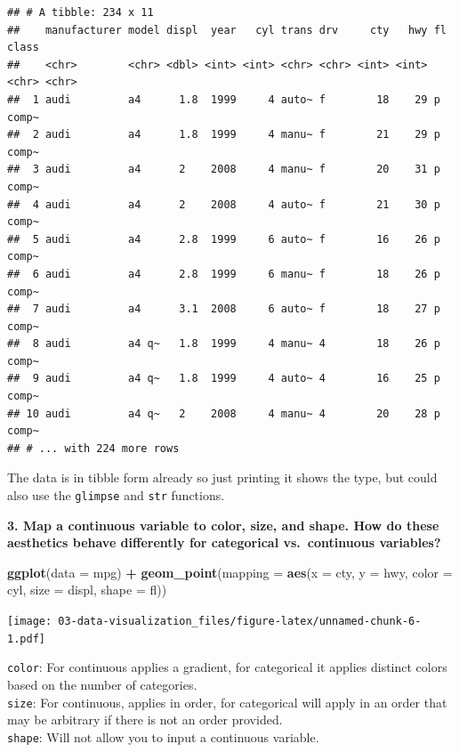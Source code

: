 \documentclass[]{book}
\newenvironment{Shaded}{\begin{snugshade}}{\end{snugshade}}
\newcommand{\DataTypeTok}[1]{\textcolor[rgb]{0.13,0.29,0.53}{#1}}
\newcommand{\KeywordTok}[1]{\textcolor[rgb]{0.13,0.29,0.53}{\textbf{#1}}}
\newcommand{\NormalTok}[1]{#1}
\newcommand{\OperatorTok}[1]{\textcolor[rgb]{0.81,0.36,0.00}{\textbf{#1}}}
\newcommand{\StringTok}[1]{\textcolor[rgb]{0.31,0.60,0.02}{#1}}
\theoremstyle{definition}
\theoremstyle{definition}
\theoremstyle{definition}
\theoremstyle{remark}
\begin{document}
\begin{verbatim}
## # A tibble: 234 x 11
##    manufacturer model displ  year   cyl trans drv     cty   hwy fl    class
##    <chr>        <chr> <dbl> <int> <int> <chr> <chr> <int> <int> <chr> <chr>
##  1 audi         a4      1.8  1999     4 auto~ f        18    29 p     comp~
##  2 audi         a4      1.8  1999     4 manu~ f        21    29 p     comp~
##  3 audi         a4      2    2008     4 manu~ f        20    31 p     comp~
##  4 audi         a4      2    2008     4 auto~ f        21    30 p     comp~
##  5 audi         a4      2.8  1999     6 auto~ f        16    26 p     comp~
##  6 audi         a4      2.8  1999     6 manu~ f        18    26 p     comp~
##  7 audi         a4      3.1  2008     6 auto~ f        18    27 p     comp~
##  8 audi         a4 q~   1.8  1999     4 manu~ 4        18    26 p     comp~
##  9 audi         a4 q~   1.8  1999     4 auto~ 4        16    25 p     comp~
## 10 audi         a4 q~   2    2008     4 manu~ 4        20    28 p     comp~
## # ... with 224 more rows
\end{verbatim}

The data is in tibble form already so just printing it shows the type,
but could also use the \texttt{glimpse} and \texttt{str} functions.

\textbf{3. Map a continuous variable to color, size, and shape. How do
these aesthetics behave differently for categorical vs.~continuous
variables?}

\begin{Shaded}
\begin{Highlighting}[]
\KeywordTok{ggplot}\NormalTok{(}\DataTypeTok{data =}\NormalTok{ mpg) }\OperatorTok{+}\StringTok{ }
\StringTok{  }\KeywordTok{geom_point}\NormalTok{(}\DataTypeTok{mapping =} \KeywordTok{aes}\NormalTok{(}\DataTypeTok{x =}\NormalTok{ cty, }\DataTypeTok{y =}\NormalTok{ hwy, }\DataTypeTok{color =}\NormalTok{ cyl, }\DataTypeTok{size =}\NormalTok{ displ, }\DataTypeTok{shape =}\NormalTok{ fl))}
\end{Highlighting}
\end{Shaded}

\texttt{[image: 03-data-visualization\_files/figure-latex/unnamed-chunk-6-1.pdf]}

\texttt{color}: For continuous applies a gradient, for categorical it
applies distinct colors based on the number of categories.\\
\texttt{size}: For continuous, applies in order, for categorical will
apply in an order that may be arbitrary if there is not an order
provided.\\
\texttt{shape}: Will not allow you to input a continuous variable.
\end{document}
